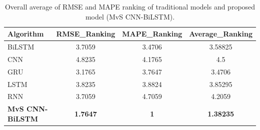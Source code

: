 \documentclass[a4paper, fleqn]{cas-sc}
\theoremstyle{definition}
\theoremstyle{remark}
\begin{document}
\begin{table}[!htp]
  \caption{Overall average of RMSE and MAPE ranking of traditional models and proposed model (MvS CNN-BiLSTM).}
  \centering
  \begin{tabular}{lccc}
  \hline
  Algorithm&RMSE\_Ranking&MAPE\_Ranking&Average\_Ranking\\\hline
  BiLSTM&3.7059&3.4706&3.58825\\
  CNN&4.8235&4.1765&4.5\\
  GRU&3.1765&3.7647&3.4706\\
  LSTM&3.8235&3.8824&3.85295\\
  RNN&3.7059&4.7059&4.2059\\
  \textbf{MvS CNN-BiLSTM}&\textbf{1.7647}&\textbf{1}&\textbf{1.38235} \\\hline
\end{tabular}
\label{AVG RANK}
  \end{table}
\end{document}
